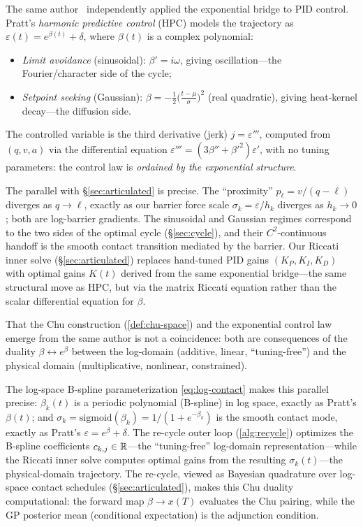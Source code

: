 \begin{remark}
\label{rmk:hpc}
The same author~\cite{PrattHPC} independently applied the exponential
bridge to PID control.
Pratt's \emph{harmonic predictive control} (HPC) models the
trajectory as $\varepsilon(t) = e^{\beta(t)} + \delta$, where
$\beta(t)$ is a complex polynomial:
\begin{itemize}[nosep]
\item \emph{Limit avoidance} (sinusoidal): $\beta' = i\omega$,
  giving oscillation---the Fourier/character side of the cycle;
\item \emph{Setpoint seeking} (Gaussian): $\beta = -\frac{1}{2}
  \bigl(\frac{t-\mu}{\sigma}\bigr)^2$
  (real quadratic), giving heat-kernel decay---the diffusion side.
\end{itemize}
The controlled variable is the third derivative (jerk)
$j = \varepsilon'''$, computed from $(q, v, a)$ via the differential
equation $\varepsilon''' = (3\beta'' + \beta'^2)\varepsilon'$,
with no tuning parameters: the control law is \emph{ordained by the
exponential structure}.

The parallel with \S\ref{sec:articulated} is precise.
The ``proximity'' $p_\ell = v/(q - \ell)$ diverges as $q \to \ell$,
exactly as our barrier force scale $\sigma_k = \varepsilon/h_k$
diverges as $h_k \to 0$; both are log-barrier gradients.
The sinusoidal and Gaussian regimes correspond to the two sides of
the optimal cycle (\S\ref{sec:cycle}), and their $C^2$-continuous
handoff is the smooth contact transition mediated by the barrier.
Our Riccati inner solve (\S\ref{sec:articulated}) replaces
hand-tuned PID gains $(K_P, K_I, K_D)$ with optimal gains $K(t)$
derived from the same exponential bridge---the same structural move
as HPC, but via the matrix Riccati equation rather than the scalar
differential equation for $\beta$.

That the Chu construction (\cref{def:chu-space}) and the
exponential control law emerge from the same author is not a
coincidence: both are consequences of the duality
$\beta \leftrightarrow e^\beta$ between the log-domain (additive,
linear, ``tuning-free'') and the physical domain (multiplicative,
nonlinear, constrained).

The log-space B-spline parameterization \eqref{eq:log-contact} makes
this parallel precise: $\beta_k(t)$ is a periodic polynomial (B-spline)
in log space, exactly as Pratt's $\beta(t)$; and
$\sigma_k = \mathrm{sigmoid}(\beta_k) = 1/(1 + e^{-\beta_k})$ is the
smooth contact mode, exactly as Pratt's
$\varepsilon = e^\beta + \delta$.
The re-cycle outer loop (\cref{alg:recycle}) optimizes the B-spline
coefficients $c_{k,j} \in \mathbb{R}$---the ``tuning-free'' log-domain
representation---while the Riccati inner solve computes optimal gains
from the resulting $\sigma_k(t)$---the physical-domain trajectory.
The re-cycle, viewed as Bayesian quadrature over log-space contact
schedules (\S\ref{sec:articulated}), makes this Chu duality
computational: the forward map $\beta \to x(T)$ evaluates the Chu
pairing, while the GP posterior mean (conditional expectation) is
the adjunction condition.
\end{remark}

